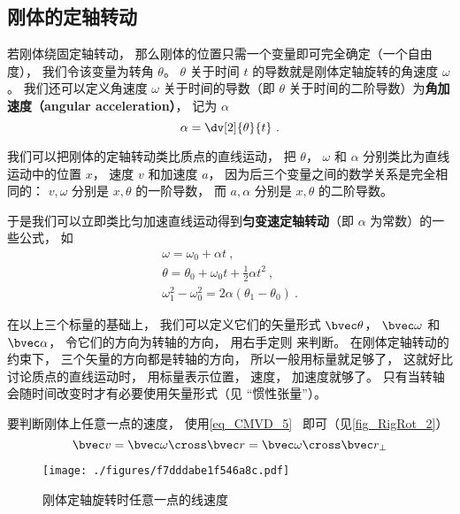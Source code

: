 

\subsection{刚体的定轴转动}
若刚体绕固定轴转动， 那么刚体的位置只需一个变量即可完全确定（一个自由度）， 我们令该变量为转角 $\theta$。 $\theta$ 关于时间 $t$ 的导数就是刚体定轴旋转的角速度 $\omega$。 我们还可以定义角速度 $\omega$ 关于时间的导数（即 $\theta$ 关于时间的二阶导数）为\textbf{角加速度（angular acceleration）}， 记为 $\alpha$
\begin{equation}
\alpha = \dv[2]{\theta}{t}~.
\end{equation}

我们可以把刚体的定轴转动类比质点的直线运动， 把 $\theta$， $\omega$ 和 $\alpha$ 分别类比为直线运动中的位置 $x$， 速度 $v$ 和加速度 $a$， 因为后三个变量之间的数学关系是完全相同的： $v, \omega$ 分别是 $x, \theta$ 的一阶导数， 而 $a, \alpha$ 分别是 $x, \theta$ 的二阶导数。

于是我们可以立即类比匀加速直线运动得到\textbf{匀变速定轴转动}（即 $\alpha$ 为常数）的一些公式， 如
\begin{gather}
\omega = \omega_0 + \alpha t~,\\
\theta = \theta_0 + \omega_0 t + \frac12 \alpha t^2~,\\
\omega_1^2 - \omega_0^2 = 2\alpha (\theta_1-\theta_0)~.
\end{gather}

在以上三个标量的基础上， 我们可以定义它们的矢量形式 $\bvec \theta$， $\bvec \omega$ 和 $\bvec \alpha$， 令它们的方向为转轴的方向， 用右手定则 来判断。 在刚体定轴转动的约束下， 三个矢量的方向都是转轴的方向， 所以一般用标量就足够了， 这就好比讨论质点的直线运动时， 用标量表示位置， 速度， 加速度就够了。 只有当转轴会随时间改变时才有必要使用矢量形式（见 “惯性张量”）。

要判断刚体上任意一点的速度， 使用\autoref{eq_CMVD_5}~ 即可（见\autoref{fig_RigRot_2}）
\begin{equation}
\bvec v = \bvec \omega \cross \bvec r = \bvec \omega \cross \bvec r_\bot
\end{equation}

\begin{figure}[ht]
\centering
\texttt{[image: ./figures/f7dddabe1f546a8c.pdf]}
\caption{刚体定轴旋转时任意一点的线速度} \label{fig_RigRot_2}
\end{figure}

